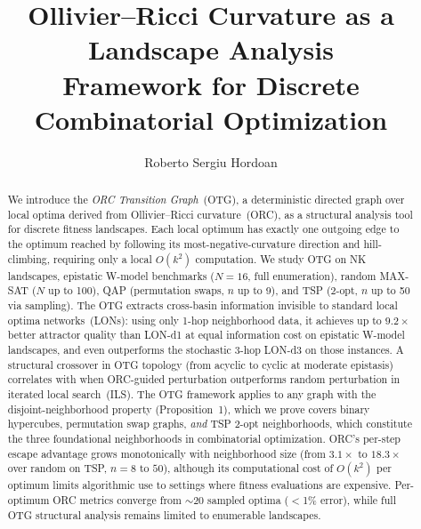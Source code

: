 \documentclass[runningheads]{llncs}
\begin{document}
\title{Ollivier--Ricci Curvature as a Landscape Analysis\\Framework for Discrete Combinatorial Optimization}

\author{Roberto Sergiu Hordoan}

\maketitle

\begin{abstract}
We introduce the \emph{ORC Transition Graph}~(OTG), a deterministic directed graph over local optima derived from Ollivier--Ricci curvature~(ORC), as a structural analysis tool for discrete fitness landscapes.
Each local optimum has exactly one outgoing edge to the optimum reached by following its most-negative-curvature direction and hill-climbing, requiring only a local $O(k^2)$ computation.
We study OTG on NK landscapes, epistatic W-model benchmarks ($N\!=\!16$, full enumeration), random MAX-SAT ($N$ up to 100), QAP (permutation swaps, $n$ up to 9), and TSP (2-opt, $n$ up to 50 via sampling).
The OTG extracts cross-basin information invisible to standard local optima networks~(LONs): using only 1-hop neighborhood data, it achieves up to $9.2\times$ better attractor quality than LON-d1 at equal information cost on epistatic W-model landscapes, and even outperforms the stochastic 3-hop LON-d3 on those instances.
A structural crossover in OTG topology (from acyclic to cyclic at moderate epistasis) correlates with when ORC-guided perturbation outperforms random perturbation in iterated local search~(ILS).
The OTG framework applies to any graph with the disjoint-neighborhood property (Proposition~1), which we prove covers binary hypercubes, permutation swap graphs, \emph{and} TSP 2-opt neighborhoods, which constitute the three foundational neighborhoods in combinatorial optimization.
ORC's per-step escape advantage grows monotonically with neighborhood size (from $3.1\times$ to $18.3\times$ over random on TSP, $n\!=\!8$ to $50$), although its computational cost of $O(k^2)$ per optimum limits algorithmic use to settings where fitness evaluations are expensive.
Per-optimum ORC metrics converge from ${\sim}20$ sampled optima ($<$1\% error), while full OTG structural analysis remains limited to enumerable landscapes.
\end{abstract}
\end{document}
